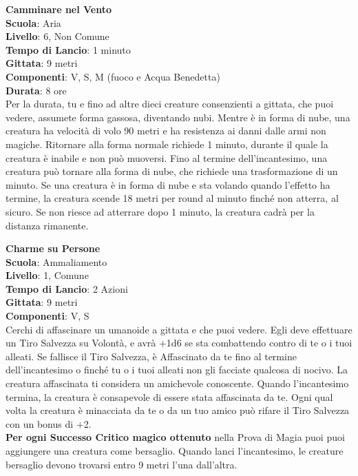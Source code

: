 \begin{multicols}{2}
\medskip\textbf{Camminare nel Vento}\\
\textbf{Scuola}: Aria\\
\textbf{Livello}: 6, Non Comune\\
\textbf{Tempo di Lancio}: 1 minuto\\
\textbf{Gittata}: 9 metri\\
\textbf{Componenti}: V, S, M (fuoco e Acqua Benedetta)\\
\textbf{Durata}: 8 ore\\
Per la durata, tu e fino ad altre dieci creature consenzienti a gittata, che puoi vedere, assumete forma gassosa, diventando nubi. Mentre è in forma di nube, una creatura ha velocità di volo 90 metri e ha resistenza ai danni dalle armi non magiche. Ritornare alla forma normale richiede 1 minuto, durante il quale la creatura è inabile e non può muoversi. Fino al termine dell'incantesimo, una creatura può tornare alla forma di nube, che richiede una trasformazione di un minuto. Se una creatura è in forma di nube e sta volando quando l'effetto ha termine, la creatura scende 18 metri per round al minuto finché non atterra, al sicuro. Se non riesce ad atterrare dopo 1 minuto, la creatura cadrà per la distanza rimanente.

\medskip\textbf{Charme su Persone}\\
\textbf{Scuola}: Ammaliamento\\
\textbf{Livello}: 1, Comune\\
\textbf{Tempo di Lancio}: 2 Azioni\\
\textbf{Gittata}: 9 metri\\
\textbf{Componenti}: V, S\\
Cerchi di affascinare un umanoide a gittata e che puoi vedere. Egli deve effettuare un Tiro Salvezza su Volontà, e avrà +1d6 se sta combattendo contro di te o i tuoi alleati. Se fallisce il Tiro Salvezza, è Affascinato da te fino al termine dell'incantesimo o finché tu o i tuoi alleati non gli facciate qualcosa di nocivo. La creatura affascinata ti considera un amichevole conoscente. Quando l'incantesimo termina, la creatura è consapevole di essere stata affascinata da te. Ogni qual volta la creatura è minacciata da te o da un tuo amico può rifare il Tiro Salvezza con un bonus di +2.\\
\textbf{Per ogni Successo Critico magico ottenuto} nella Prova di Magia puoi puoi aggiungere una creatura come bersaglio. Quando lanci l'incantesimo, le creature bersaglio devono trovarsi entro 9 metri l'una dall'altra.


\end{multicols}

